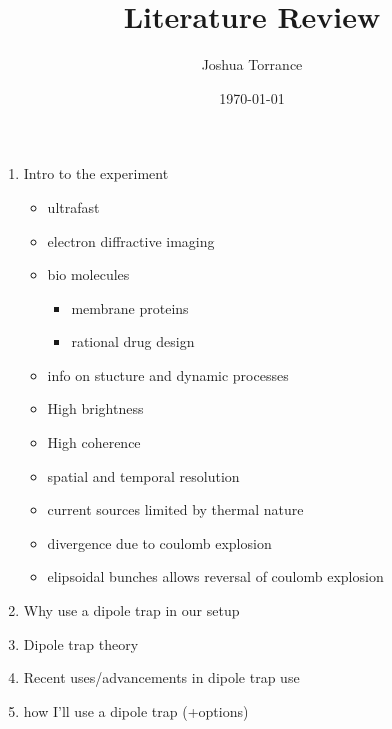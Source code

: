 \documentclass[12pt]{article}
\title{Literature Review}
\author{Joshua Torrance}
\date{\today}
\begin{document}
\maketitle

\begin{enumerate}
    \item Intro to the experiment
    \begin{itemize}
        \item ultrafast
        \item electron diffractive imaging
        \item bio molecules
        \begin{itemize}
            \item membrane proteins
            \item rational drug design
        \end{itemize}
        \item info on stucture and dynamic processes
        \item High brightness
        \item High coherence
        \item spatial and temporal resolution
        \item current sources limited by thermal nature
        \item divergence due to coulomb explosion
        \item elipsoidal bunches allows reversal of coulomb explosion
    \end{itemize}
    \item Why use a dipole trap in our setup
    \item Dipole trap theory
    \item Recent uses/advancements in dipole trap use
    \item how I'll use a dipole trap (+options)
\end{enumerate}




\printglossaries

{}

\end{document}
